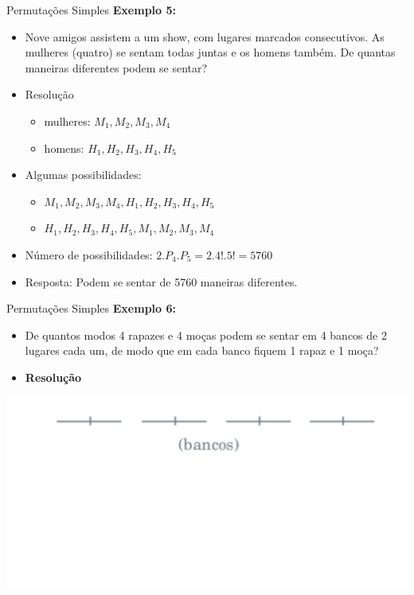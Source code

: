 \documentclass[aspectratio=169]{beamer}
\begin{document}
\begin{frame}{Permutações Simples}
    \textbf{Exemplo 5:}

    \vspace{2mm}

    \begin{itemize}
        \item[] Nove amigos assistem a um show, com lugares marcados consecutivos. As mulheres (quatro) se sentam todas juntas e os homens também. De quantas maneiras diferentes podem se sentar?
    \end{itemize}

    \vspace{3mm}

    \pause
    \begin{itemize}
        \item Resolução
        \begin{itemize}
            \item mulheres: $M_1, M_2, M_3, M_4$
            \item homens: $H_1, H_2, H_3, H_4, H_5$
        \end{itemize}
        \pause
        \item Algumas possibilidades: 
        \begin{itemize}
            \item $M_1, M_2, M_3, M_4, H_1, H_2, H_3, H_4, H_5$ \pause
            \item $H_1, H_2, H_3, H_4, H_5, M_1, M_2, M_3, M_4$
        \end{itemize} \pause
        \item Número de possibilidades: $2.P_4.P_5 = 2.4!.5! = 5760$ \pause
        \item Resposta: Podem se sentar de 5760 maneiras diferentes.
    \end{itemize}
\end{frame}

\begin{frame}{Permutações Simples}
    \textbf{Exemplo 6:}

    \vspace{2mm}

    \begin{itemize}
        \item[] De quantos modos 4 rapazes e 4 moças podem se sentar em 4 bancos de 2 lugares cada um, de modo que em cada banco fiquem 1 rapaz e 1 moça? \pause
        \item[] \textbf{Resolução}
    \end{itemize}

    \begin{center}
        \includegraphics[width=0.65\linewidth]{figs/Exemplo6_1.png}
    \end{center}
\end{frame}
\end{document}
